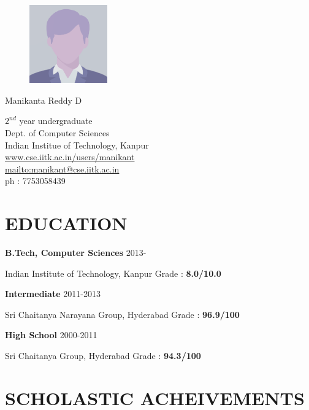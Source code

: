 \documentclass{article}
\newcommand{\sepspace}{\vspace*{0.8em}}
\newcommand{\MyName}[1]{
		\huge \usefont{OT1}{phv}{b}{n} \hfill #1 		
		\normalsize \normalfont
		}
\newcommand{\NewPart}[1]{\section*{\uppercase{#1}}}
\newcommand{\EducationEntry}[4]{
		\noindent \textbf{#1} \hfill 	{#2} \par				
		\noindent #3 \hfill	
		Grade : \textbf{#4} 	
		}
\begin{document}
\begin{figure}
	\vspace*{-3em}
		\includegraphics[width=0.3\textwidth]{photo.png}
\end{figure}

\MyName{Manikanta Reddy D}
\begin{flushright}
	$2^{nd}$ year undergraduate\\
	Dept. of Computer Sciences\\
	Indian Institue of Technology, Kanpur\\
	\url{www.cse.iitk.ac.in/users/manikant}\\
	\url{mailto:manikant@cse.iitk.ac.in}\\
	ph : 7753058439
\end{flushright}

\sepspace

\NewPart{Education}{}

\EducationEntry{B.Tech, Computer Sciences}{2013-}{Indian Institute of Technology, Kanpur}{8.0/10.0}

\sepspace

\EducationEntry{Intermediate}{2011-2013}{Sri Chaitanya Narayana Group, Hyderabad}{96.9/100}

\sepspace

\EducationEntry{High School}{2000-2011}{Sri Chaitanya Group, Hyderabad}{94.3/100}


\NewPart{Scholastic Acheivements}{}
\end{document}
